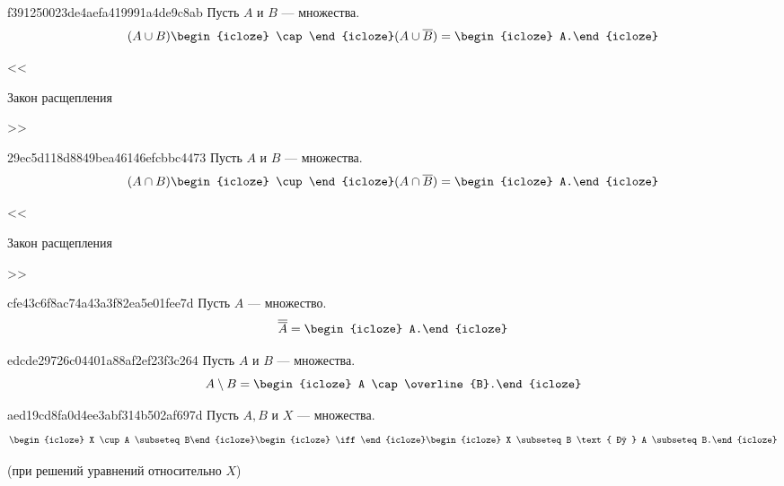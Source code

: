 \begin{note}{f391250023de4aefa419991a4de9c8ab}
    Пусть \({ A }\) и \({ B }\) --- множества.
    \[
        (A \cup B) \begin{icloze}{2}\cap\end{icloze} (A \cup \overline{B}) = \begin{icloze}{1}A.\end{icloze}
    \]

    \begin{center}
        \tiny
        <<\begin{icloze}{3}Закон расщепления\end{icloze}>>
    \end{center}
\end{note}

\begin{note}{29ec5d118d8849bea46146efcbbc4473}
    Пусть \({ A }\) и \({ B }\) --- множества.
    \[
        (A \cap B) \begin{icloze}{2}\cup\end{icloze} (A \cap \overline{B}) = \begin{icloze}{1}A.\end{icloze}
    \]

    \begin{center}
        \tiny
        <<\begin{icloze}{3}Закон расщепления\end{icloze}>>
    \end{center}
\end{note}

\begin{note}{cfe43c6f8ac74a43a3f82ea5e01fee7d}
    Пусть \({ A }\) --- множество.
    \[
        \overline{\overline{A}} = \begin{icloze}{1}A.\end{icloze}
    \]
\end{note}

\begin{note}{edcde29726c04401a88af2ef23f3c264}
    Пусть \({ A }\) и \({ B }\) --- множества.
    \[
        A \setminus B = \begin{icloze}{1}A \cap \overline{B}.\end{icloze}
    \]
\end{note}

\begin{note}{aed19cd8fa0d4ee3abf314b502af697d}
    Пусть \({ A, B }\) и \({ X }\) --- множества.
    \[
        \begin{icloze}{2}X \cup A \subseteq B\end{icloze} \begin{icloze}{3}\iff\end{icloze} \begin{icloze}{1}X \subseteq B \text{ и } A \subseteq B.\end{icloze}
    \]

    \begin{center}
        \tiny
        (при решений уравнений относительно \({ X }\))
    \end{center}
\end{note}


